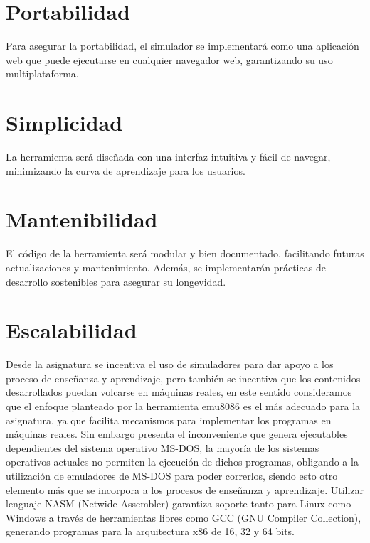 \documentclass[12pt,twoside]{templates/unerthesis}
\begin{document}
\hypertarget{portabilidad}{%
\section{Portabilidad}\label{portabilidad}}

Para asegurar la portabilidad, el simulador se implementará como una aplicación web que puede ejecutarse en cualquier navegador web, garantizando su uso multiplataforma.

\hypertarget{simplicidad}{%
\section{Simplicidad}\label{simplicidad}}

La herramienta será diseñada con una interfaz intuitiva y fácil de navegar, minimizando la curva de aprendizaje para los usuarios.

\hypertarget{mantenibilidad}{%
\section{Mantenibilidad}\label{mantenibilidad}}

El código de la herramienta será modular y bien documentado, facilitando futuras actualizaciones y mantenimiento. Además, se implementarán prácticas de desarrollo sostenibles para asegurar su longevidad.

\hypertarget{escalabilidad}{%
\section{Escalabilidad}\label{escalabilidad}}

Desde la asignatura se incentiva el uso de simuladores para dar apoyo a los proceso de enseñanza y aprendizaje, pero también se incentiva que los contenidos desarrollados puedan volcarse en máquinas reales, en este sentido consideramos que el enfoque planteado por la herramienta emu8086 es el más adecuado para la asignatura, ya que facilita mecanismos para implementar los programas en máquinas reales. Sin embargo presenta el inconveniente que genera ejecutables dependientes del sistema operativo MS-DOS, la mayoría de los sistemas operativos actuales no permiten la ejecución de dichos programas, obligando a la utilización de emuladores de MS-DOS para poder correrlos, siendo esto otro elemento más que se incorpora a los procesos de enseñanza y aprendizaje.
Utilizar lenguaje NASM (Netwide Assembler) garantiza soporte tanto para Linux como Windows a través de herramientas libres como GCC (GNU Compiler Collection), generando programas para la arquitectura x86 de 16, 32 y 64 bits.
\end{document}
